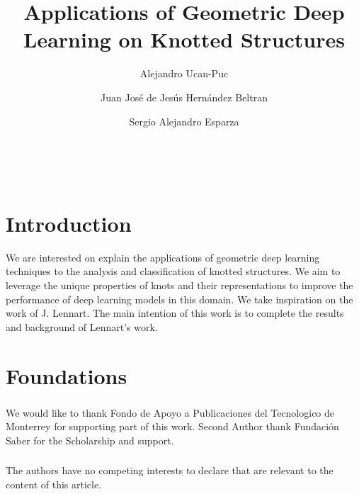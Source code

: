 \documentclass[runningheads]{llncs}
\begin{document}
%
\title{Applications of Geometric Deep Learning on Knotted Structures}
%
%
\author{Alejandro Ucan-Puc   \and Juan José de Jesús Hernández Beltran  \and Sergio Alejandro Esparza }
%
%
\\
%
\maketitle 
%
\begin{abstract}

\keywords{}
\end{abstract}
%
%
%
\section{Introduction}

We are interested on explain the applications of geometric deep learning techniques to the analysis and classification of knotted structures. We aim to leverage the unique properties of knots and their representations to improve the performance of deep learning models in this domain. We take inspiration on the work of J. Lennart. The main intention of this work is to complete the results and background of Lennart's work.

\section{Foundations}



\begin{credits}
\subsubsection{\ackname} We would like to thank Fondo de Apoyo a Publicaciones del Tecnologico de Monterrey for supporting part of this work. Second Author thank Fundación Saber for the Scholarship and support.

\subsubsection{\discintname}
 The authors have no competing interests to declare that are
relevant to the content of this article.
\end{credits}
%
%
%
 
 
%
\end{document}
